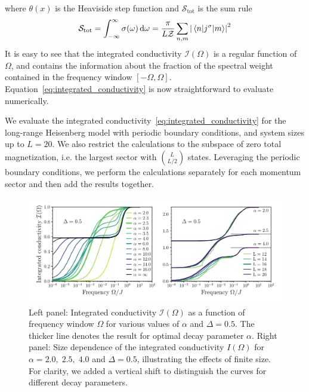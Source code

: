 where \(\theta(x)\) is the Heaviside step function and  \(\mathcal{S}_{\mathrm{tot}}\) is the sum rule
\begin{equation}
  \mathcal{S}_{\mathrm{tot}} = \int_{-\infty}^{\infty} \sigma(\omega) \dd{\omega} = \frac{\pi}{L \mathcal{Z}} \sum_{n,m} \abs{\mel{n}{j^{\sigma}}{m}}^2
\end{equation}
It is easy to see that the integrated conductivity \(\mathcal{I}(\Omega)\) is a regular function of \(\Omega\), and
contains the information about the fraction of the spectral weight contained in the frequency window
\(\left[-\Omega,\Omega\right]\).
Equation~\eqref{eq:integrated_conductivity} is now straightforward to evaluate numerically.

We evaluate the integrated conductivity~\eqref{eq:integrated_conductivity} for the long-range Heisenberg model
with periodic boundary conditions, and system sizes up to \(L=20\). We also restrict the calculations to the
subspace of zero total magnetization, i.e. the largest sector with \(\binom{L}{L/2}\) states. Leveraging
the periodic boundary conditions, we perform the calculations separately for each momentum sector and then
add the results together.

\begin{figure}[htbp]
  \centering
  \includegraphics[width=\linewidth]{Figures/optical_conductivity.pdf}
  \caption{Left panel: Integrated conductivity \(\mathcal{I}(\Omega)\) as a function of frequency window \(\Omega\) for various values of \(\alpha\)
    and \(\Delta = 0.5\). The thicker line denotes the result for optimal decay parameter \(\alpha\). Right panel: Size dependence
    of the integrated conductivity \(I(\Omega)\) for \(\alpha = 2.0, \; 2.5,\; 4.0\) and \(\Delta = 0.5\),
    illustrating the effects of finite size. For clarity, we added a vertical shift to distinguish the curves for different
    decay parameters.}
  \label{fig:optical_conductivity}
\end{figure}


